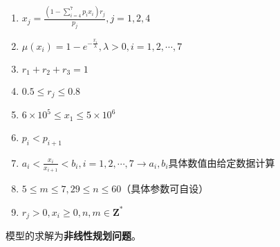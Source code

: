 {\begin{enumerate}
\begin{enumerate}
\begin{enumerate}
				\item $x_j = \frac{(1-\sum_{i=4}^{7}p_i x_i)r_j}{p_j},j = 1,2,4$
				\item $\mu(x_i) = 1 - e^{-\frac{x_i}{\lambda}},\lambda > 0,i = 1,2,\cdots,7$
				\item $r_1 + r_2 + r_3 = 1$
				\item $0.5\leq r_j \leq 0.8$
				\item $6\times10^5 \leq x_1 \leq 5\times10^6$
				\item $p_i < p_{i+1}$
				\item $a_i < \frac{x_i}{x_{i+1}} < b_i,i = 1,2,\cdots,7\longrightarrow a_i,b_i$具体数值由给定数据计算
				\item $5\leq m \leq 7,29\leq n \leq 60$（具体参数可自设）
				\item $r_j>0,x_i\ge 0,n,m\in\mathbf{Z}^*$
			\end{enumerate}
		\end{enumerate}
	\end{enumerate}
	}
	模型的求解为\textbf{非线性规划问题}。